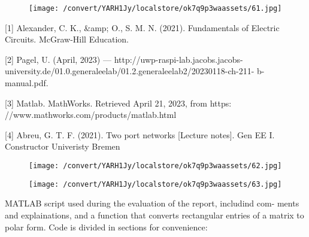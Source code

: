 \documentclass[12pt]{report}
\begin{document}
\vspace{10pt}

\begin{figure}[h]

\texttt{[image: /convert/YARH1Jy/localstore/ok7q9p3waassets/61.jpg]}

\centering

\end{figure}

    [1] Alexander, C. K., \&amp; O., S. M. N. (2021). Fundamentals of Electric  Circuits. McGraw-Hill Education. 

\vspace{10pt}

    [2] Pagel, U. (April, 2023) — http://uwp-raspi-lab.jacobs.jacobs-  university.de/01.0.generaleelab/01.2.generaleelab2/20230118-ch-211-  b-manual.pdf. 

\vspace{10pt}

    [3] Matlab. MathWorks. Retrieved April 21, 2023, from  https: //www.mathworks.com/products/matlab.html 

\vspace{10pt}

    [4] Abreu, G. T. F. (2021). Two port networks [Lecture notes]. Gen EE I.  Constructor Univeristy Bremen 

\vspace{10pt}

\begin{figure}[h]

\texttt{[image: /convert/YARH1Jy/localstore/ok7q9p3waassets/62.jpg]}

\centering

\end{figure}

\par

\vspace{10pt}

\begin{figure}[h]

\texttt{[image: /convert/YARH1Jy/localstore/ok7q9p3waassets/63.jpg]}

\centering

\end{figure}

    MATLAB script used during the evaluation of the report, includind com-  ments and explainations, and a function that converts rectangular entries of  a matrix to polar form. Code is divided in sections for convenience: 
\end{document}
